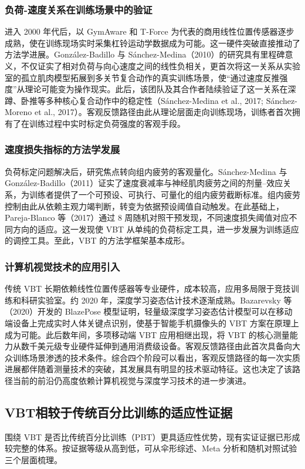 \documentclass[UTF8,zihao=-4,twoside,openany]{ctexbook}
\begin{document}
\subsubsection{负荷-速度关系在训练场景中的验证}
进入 2000 年代后，以 GymAware 和 T-Force 为代表的商用线性位置传感器逐步成熟，使在训练现场实时采集杠铃运动学数据成为可能。这一硬件突破直接推动了方法学进展。González-Badillo 与 Sánchez-Medina（2010）的研究具有里程碑意义，不仅证实了相对负荷与向心速度之间的线性负相关，更首次将这一关系从实验室的孤立肌肉模型拓展到多关节复合动作的真实训练场景，使“通过速度反推强度”从理论可能变为操作现实。此后，该团队及其合作者陆续验证了这一关系在深蹲、卧推等多种核心复合动作中的稳定性（Sánchez-Medina et al., 2017; Sánchez-Moreno et al., 2017）。客观反馈路径由此从理论层面走向训练现场，训练者首次拥有了在训练过程中实时标定负荷强度的客观手段。

\subsubsection{速度损失指标的方法学发展}
负荷标定问题解决后，研究焦点转向组内疲劳的客观量化。Sánchez-Medina 与 González-Badillo（2011）证实了速度衰减率与神经肌肉疲劳之间的剂量--效应关系，为训练者提供了一个可预设、可执行、可量化的组内疲劳截断标准。组内疲劳控制由此从依赖主观力竭判断，转变为依据预设阈值自动触发。在此基础上，Pareja-Blanco 等（2017）通过 8 周随机对照干预发现，不同速度损失阈值对应不同方向的适应。这一发现使 VBT 从单纯的负荷标定工具，进一步发展为训练适应的调控工具。至此，VBT 的方法学框架基本成形。

\subsubsection{计算机视觉技术的应用引入}
传统 VBT 长期依赖线性位置传感器等专业硬件，成本较高，应用多局限于竞技训练和科研实验室。约 2020 年，深度学习姿态估计技术逐渐成熟。Bazarevsky 等（2020）开发的 BlazePose 模型证明，轻量级深度学习姿态估计模型可以在移动端设备上完成实时人体关键点识别，使基于智能手机摄像头的 VBT 方案在原理上成为可能。此后数年间，多项移动端 VBT 应用相继出现，将 VBT 的核心测量能力从数千美元级专业硬件延伸到通用消费级设备。客观反馈路径由此首次具备向大众训练场景渗透的技术条件。综合四个阶段可以看出，客观反馈路径的每一次实质进展都伴随着测量技术的突破，其发展具有明显的技术驱动特征。这也决定了该路径当前的前沿仍高度依赖计算机视觉与深度学习技术的进一步演进。

\subsection{VBT相较于传统百分比训练的适应性证据}
围绕 VBT 是否比传统百分比训练（PBT）更具适应性优势，现有实证证据已形成较完整的体系。按证据等级从高到低，可从伞形综述、Meta 分析和随机对照试验三个层面梳理。
\end{document}

